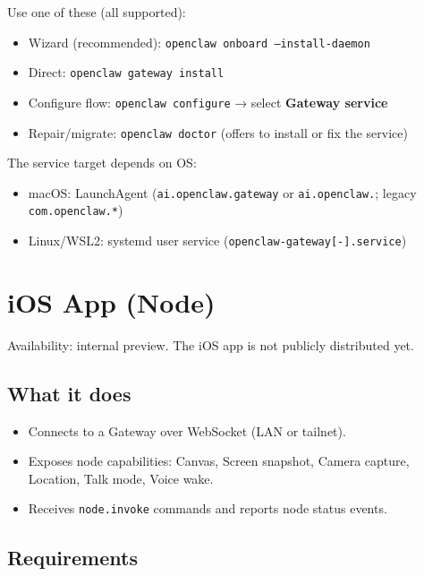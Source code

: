 Use one of these (all supported):

\begin{itemize}
  \item Wizard (recommended): \texttt{openclaw onboard --install-daemon}
  \item Direct: \texttt{openclaw gateway install}
  \item Configure flow: \texttt{openclaw configure} → select \textbf{Gateway service}
  \item Repair/migrate: \texttt{openclaw doctor} (offers to install or fix the service)
\end{itemize}


The service target depends on OS:

\begin{itemize}
  \item macOS: LaunchAgent (\texttt{ai.openclaw.gateway} or \texttt{ai.openclaw.}; legacy \texttt{com.openclaw.*})
  \item Linux/WSL2: systemd user service (\texttt{openclaw-gateway[-].service})
\end{itemize}



\clearpage

\section{iOS App (Node)}


Availability: internal preview. The iOS app is not publicly distributed yet.

\subsection{What it does}


\begin{itemize}
  \item Connects to a Gateway over WebSocket (LAN or tailnet).
  \item Exposes node capabilities: Canvas, Screen snapshot, Camera capture, Location, Talk mode, Voice wake.
  \item Receives \texttt{node.invoke} commands and reports node status events.
\end{itemize}


\subsection{Requirements}


